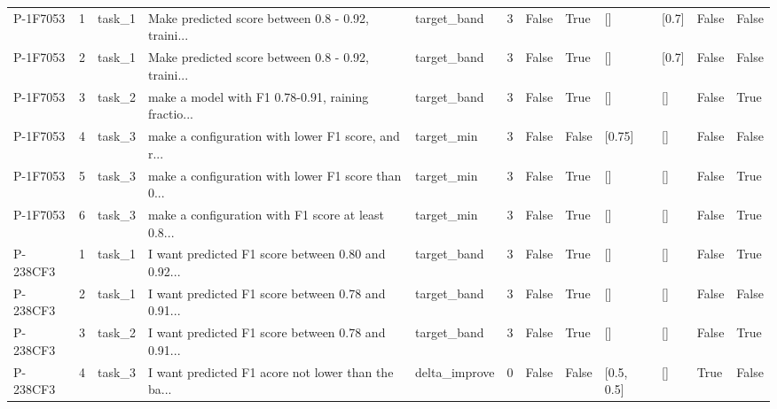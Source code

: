 \begin{tabular}{lrlllrllllll}
   P-1F7053 &        1 & task\_1 & Make predicted score between 0.8 - 0.92, traini... &   target\_band &          3 &          False &                  True &               [] &          [0.7] &              False &            False \\
   P-1F7053 &        2 & task\_1 & Make predicted score between 0.8 - 0.92, traini... &   target\_band &          3 &          False &                  True &               [] &          [0.7] &              False &            False \\
   P-1F7053 &        3 & task\_2 & make a model with F1 0.78-0.91, raining fractio... &   target\_band &          3 &          False &                  True &               [] &             [] &              False &             True \\
   P-1F7053 &        4 & task\_3 & make a configuration with lower F1 score, and r... &    target\_min &          3 &          False &                 False &           [0.75] &             [] &              False &            False \\
   P-1F7053 &        5 & task\_3 & make a configuration with lower F1 score than 0... &    target\_min &          3 &          False &                  True &               [] &             [] &              False &             True \\
   P-1F7053 &        6 & task\_3 & make a configuration with F1 score at least 0.8... &    target\_min &          3 &          False &                  True &               [] &             [] &              False &             True \\
   P-238CF3 &        1 & task\_1 & I want predicted F1 score between 0.80 and 0.92... &   target\_band &          3 &          False &                  True &               [] &             [] &              False &             True \\
   P-238CF3 &        2 & task\_1 & I want predicted F1 score between 0.78 and 0.91... &   target\_band &          3 &          False &                  True &               [] &             [] &              False &            False \\
   P-238CF3 &        3 & task\_2 & I want predicted F1 score between 0.78 and 0.91... &   target\_band &          3 &          False &                  True &               [] &             [] &              False &             True \\
   P-238CF3 &        4 & task\_3 & I want predicted F1 acore not lower than the ba... & delta\_improve &          0 &          False &                 False &       [0.5, 0.5] &             [] &               True &            False \\

\end{tabular}
